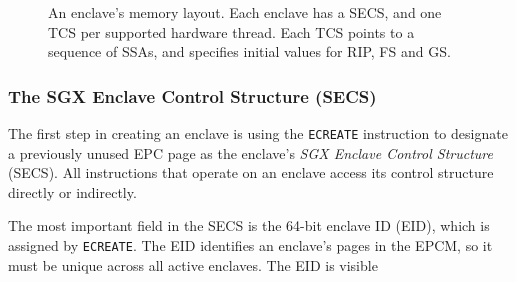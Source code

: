 \begin{figure}[hbt!]
  \caption{
    An enclave's memory layout. Each enclave has a SECS, and one TCS per
    supported hardware thread. Each TCS points to a sequence of SSAs, and
    specifies initial values for RIP, FS and GS.
  }
  \label{fig:enclave_layout}
\end{figure}

\subsubsection{The SGX Enclave Control Structure (SECS)}
\label{sec:secs}


The first step in creating an enclave is using the \texttt{ECREATE} instruction
to designate a previously unused EPC page as the enclave's \textit{SGX Enclave
Control Structure} (SECS). All instructions that operate on an enclave access
its control structure directly or indirectly.

The most important field in the SECS is the 64-bit enclave ID (EID), which is
assigned by \texttt{ECREATE}. The EID identifies an enclave's pages in the
EPCM, so it must be unique across all active enclaves. The EID is visible

